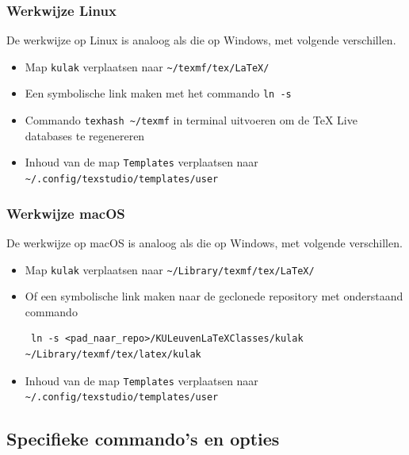 \documentclass[kulak]{kulakarticle} %
\begin{document}
\subsubsection{Werkwijze Linux}
\label{sssec:linux}

De werkwijze op Linux is analoog als die op Windows, met volgende verschillen.

\begin{itemize}
	\item Map \texttt{kulak} verplaatsen naar \verb+~/texmf/tex/LaTeX/+
	\item Een symbolische link maken met het commando \texttt{ln -s }
	\item Commando \verb+texhash ~/texmf+ in terminal uitvoeren om de TeX Live databases te regenereren
	\item Inhoud van de map \texttt{Templates} verplaatsen naar \verb+~/.config/texstudio/templates/user+
\end{itemize}

\subsubsection{Werkwijze macOS}
\label{sssec:macos}

De werkwijze op macOS is analoog als die op Windows, met volgende verschillen.
\begin{itemize}
	\item Map \texttt{kulak} verplaatsen naar \verb+~/Library/texmf/tex/LaTeX/+
	\item Of een symbolische link maken naar de geclonede repository met onderstaand commando
	      \begin{verbatim} ln -s <pad_naar_repo>/KULeuvenLaTeXClasses/kulak ~/Library/texmf/tex/latex/kulak\end{verbatim}
	\item Inhoud van de map \texttt{Templates} verplaatsen naar \verb+~/.config/texstudio/templates/user+
\end{itemize}

\subsection{Specifieke commando's en opties}
\end{document}

